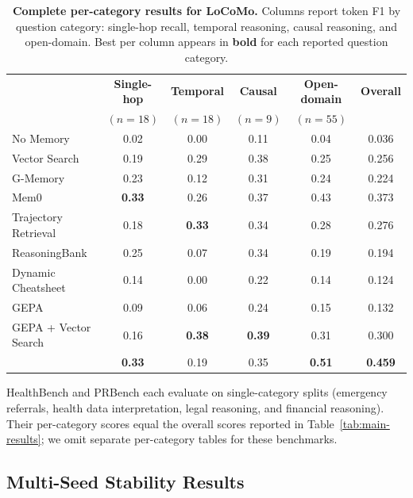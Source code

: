 \begin{table}[!htbp]
\centering
\caption{\textbf{Complete per-category results for LoCoMo.}
Columns report token F1 by question category: single-hop recall, temporal reasoning, causal reasoning, and open-domain.
Best per column appears in \textbf{bold} for each reported question category.}
\label{tab:per-cat-locomo}
\small
\setlength{\tabcolsep}{5pt}
\begin{tabular}{@{}l cccc c@{}}
\toprule
& \textbf{Single-hop} & \textbf{Temporal} & \textbf{Causal} & \textbf{Open-domain} & \textbf{Overall} \\
& \footnotesize$(n{=}18)$ & \footnotesize$(n{=}18)$ & \footnotesize$(n{=}9)$ & \footnotesize$(n{=}55)$ & \\
\midrule
No Memory            & 0.02 & 0.00 & 0.11 & 0.04 & 0.036 \\
Vector Search        & 0.19 & 0.29 & 0.38 & 0.25 & 0.256 \\
G-Memory             & 0.23 & 0.12 & 0.31 & 0.24 & 0.224 \\
Mem0                 & \textbf{0.33} & 0.26 & 0.37 & 0.43 & 0.373 \\
Trajectory Retrieval & 0.18 & \textbf{0.33} & 0.34 & 0.28 & 0.276 \\
ReasoningBank        & 0.25 & 0.07 & 0.34 & 0.19 & 0.194 \\
Dynamic Cheatsheet   & 0.14 & 0.00 & 0.22 & 0.14 & 0.124 \\
GEPA                 & 0.09 & 0.06 & 0.24 & 0.15 & 0.132 \\
GEPA + Vector Search & 0.16 & \textbf{0.38} & \textbf{0.39} & 0.31 & 0.300 \\
\rowcolor{green!10}
\sysname{}           & \textbf{0.33} & 0.19 & 0.35 & \textbf{0.51} & \textbf{0.459} \\
\bottomrule
\end{tabular}
\end{table}


HealthBench and PRBench each evaluate on single-category splits (emergency referrals, health data interpretation, legal reasoning, and financial reasoning).
Their per-category scores equal the overall scores reported in Table~\ref{tab:main-results}; we omit separate per-category tables for these benchmarks.



\subsection{Multi-Seed Stability Results}
\label{app:stability}

